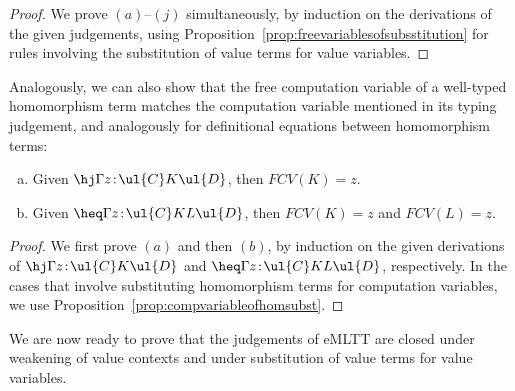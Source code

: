 \begin{proof}
We prove $(a)$--$(j)$ simultaneously, by induction on the derivations of the given judgements, using Proposition~\ref{prop:freevariablesofsubsstitution} for rules involving the substitution of value terms for value variables.
\end{proof}

Analogously, we can also show that the free computation variable of a well-typed homomorphism term matches the computation variable mentioned in its typing judgement, and analogously for definitional equations between homomorphism terms:



\pagebreak

\begin{proposition} \mbox{}
\label{prop:freecomputationvariables}
\begin{enumerate}[(a)]
\item Given $\hj \Gamma {z \!:\! \ul{C}} K {\ul{D}}$, then $FCV(K) = z$.
\item Given $\heq \Gamma {z \!:\! \ul{C}} K L {\ul{D}}$, then $FCV(K) = z$ and $FCV(L) = z$.
\end{enumerate}
\end{proposition}

\begin{proof}
We first prove $(a)$ and then $(b)$, by induction on the given derivations of \linebreak $\hj \Gamma {z \!:\! \ul{C}} K {\ul{D}}$ and  $\heq \Gamma {z \!:\! \ul{C}} K L {\ul{D}}$, respectively. In the cases that involve substituting homomorphism terms for computation variables, we use Proposition~\ref{prop:compvariableofhomsubst}.
\end{proof}

We are now ready to prove that the judgements of eMLTT are closed under weakening of value contexts and under substitution of value terms for value variables. 


